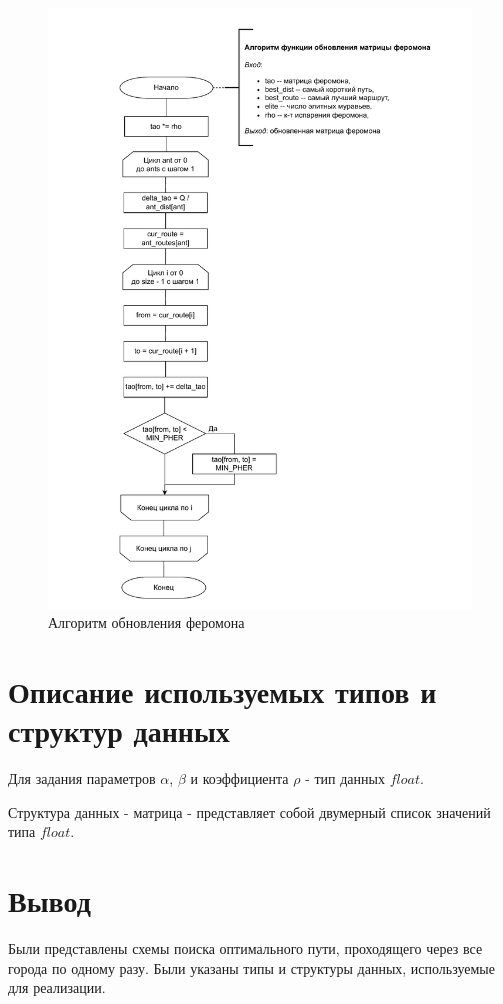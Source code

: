 \begin{figure}[H]
	\begin{center}
		\includegraphics[scale=0.7]{img/up_pher.pdf}
	\end{center}
	\captionsetup{justification=centering}
	\caption{Алгоритм обновления феромона}
	\label{img:update}
\end{figure}

\section{Описание используемых типов и структур данных}

Для задания параметров $\alpha$, $\beta$ и коэффициента $\rho$ - тип данных $float$.

Структура данных - матрица - представляет собой двумерный список значений типа $float$.


\section{Вывод}

Были представлены схемы поиска оптимального пути, проходящего через все города по одному разу. Были указаны типы и структуры данных, используемые для реализации.
